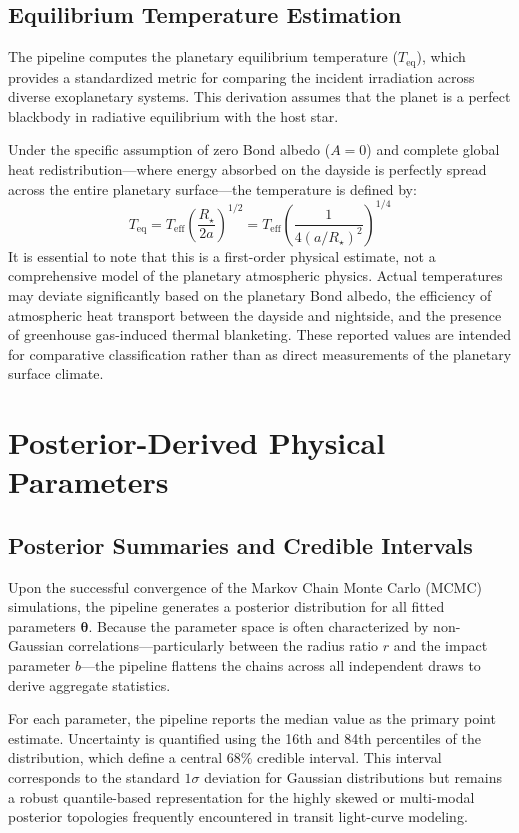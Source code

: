 \documentclass[12pt,a4paper,oneside]{report}
\newcommand{\Rstar}{\ensuremath{R_{\star}}}
\newcommand{\Teff}{\ensuremath{T_{\mathrm{eff}}}}
\begin{document}
\section{Equilibrium Temperature Estimation}
The pipeline computes the planetary equilibrium temperature ($T_{\mathrm{eq}}$), which provides a standardized metric for comparing the incident irradiation across diverse exoplanetary systems. This derivation assumes that the planet is a perfect blackbody in radiative equilibrium with the host star. 

Under the specific assumption of zero Bond albedo ($A=0$) and complete global heat redistribution—where energy absorbed on the dayside is perfectly spread across the entire planetary surface—the temperature is defined by:
\begin{equation}
  T_{\mathrm{eq}} = \Teff \left( \frac{\Rstar}{2a} \right)^{1/2} = \Teff \left( \frac{1}{4(a/\Rstar)^2} \right)^{1/4}
\end{equation}
It is essential to note that this is a first-order physical estimate, not a comprehensive model of the planetary atmospheric physics. Actual temperatures may deviate significantly based on the planetary Bond albedo, the efficiency of atmospheric heat transport between the dayside and nightside, and the presence of greenhouse gas-induced thermal blanketing. These reported values are intended for comparative classification rather than as direct measurements of the planetary surface climate.

\chapter{Posterior-Derived Physical Parameters}

\section{Posterior Summaries and Credible Intervals}
Upon the successful convergence of the Markov Chain Monte Carlo (MCMC) simulations, the pipeline generates a posterior distribution for all fitted parameters $\boldsymbol{\theta}$. Because the parameter space is often characterized by non-Gaussian correlations—particularly between the radius ratio $r$ and the impact parameter $b$—the pipeline flattens the chains across all independent draws to derive aggregate statistics.

For each parameter, the pipeline reports the median value as the primary point estimate. Uncertainty is quantified using the 16th and 84th percentiles of the distribution, which define a central 68\% credible interval. This interval corresponds to the standard $1\sigma$ deviation for Gaussian distributions but remains a robust quantile-based representation for the highly skewed or multi-modal posterior topologies frequently encountered in transit light-curve modeling.
\end{document}
